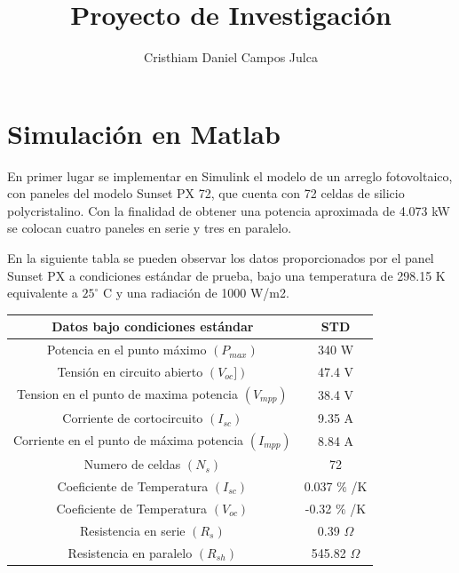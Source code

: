 \documentclass[a4paper,12pt]{article}
\title{Proyecto de Investigación}
\author{Cristhiam Daniel Campos Julca}
\begin{document}
 
	\maketitle 
	
	\section{Simulación en Matlab}
	
	En primer lugar se implementar en Simulink el modelo de un arreglo fotovoltaico, con paneles del modelo Sunset PX 72, que cuenta con 72 celdas de silicio polycristalino. Con la finalidad de obtener una potencia aproximada de 4.073 kW se colocan cuatro paneles en serie y tres en paralelo. 
	
	En la siguiente tabla se pueden observar los datos proporcionados por el panel Sunset PX a condiciones estándar de prueba, bajo una temperatura de	298.15 K equivalente a $25^{\circ}$ C y una radiación de 1000 W/m2. \newline
	
	
	\begin{tabular}{| c | c |}
		\hline
		\textbf{Datos bajo condiciones estándar} & \textbf{STD} \\ \hline
		Potencia en el punto máximo $(P_{max})$  & 340 W \\ \hline
		Tensión en circuito abierto $(V_{oc}])$ & 47.4 V \\ \hline
		Tension en el punto de maxima potencia $(V_{mpp})$ & 38.4 V \\ \hline
		Corriente de cortocircuito $ (I_{sc})$ & 9.35 A \\ \hline
		Corriente en el punto de máxima potencia $(I_{mpp})$ & 8.84 A \\ \hline
		Numero de celdas $(N_s)$ & 72 \\ \hline
		Coeficiente de Temperatura $(I_{sc})$ & 0.037 $\%$ /K \\ \hline
		Coeficiente de Temperatura $(V_{oc})$ & -0.32 $\%$ /K \\ \hline
		Resistencia en serie $(R_s)$ & 0.39 $\Omega$\\ \hline
		Resistencia en paralelo $(R_{sh})$ & 545.82 $\Omega$ \\ \hline
	\end{tabular} 

	
	\newpage
	
\end{document}
